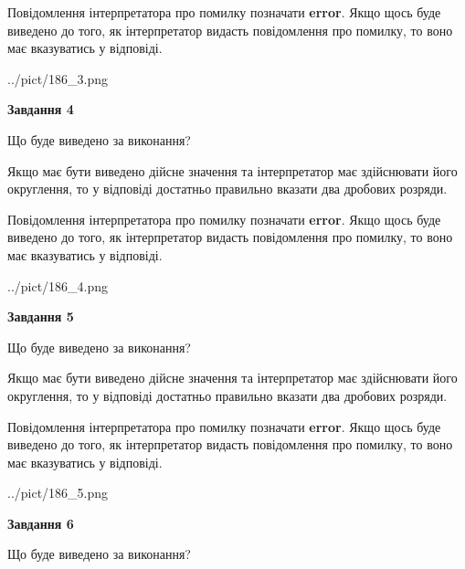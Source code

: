 \documentclass[12pt, ukrainian]{article}
\begin{document}
{\begin {Large}
Повідомлення інтерпретатора про помилку позначати \textbf{error}.
Якщо щось буде виведено до того, як інтерпретатор видасть повідомлення про помилку, 
то воно має вказуватись у відповіді. \par

\begin{center}
	{../pict/186_3.png}
\end{center}
\newpage

{\begin {center}\textbf{Завдання 4}\end {center}}\par
Що буде виведено за виконання? \par

Якщо має бути виведено дійсне значення та інтерпретатор має здійснювати його округлення, 
то у відповіді достатньо правильно вказати два дробових розряди.

Повідомлення інтерпретатора про помилку позначати \textbf{error}.
Якщо щось буде виведено до того, як інтерпретатор видасть повідомлення про помилку, 
то воно має вказуватись у відповіді. \par

\begin{center}
	{../pict/186_4.png}
\end{center}
\newpage

{\begin {center}\textbf{Завдання 5}\end {center}}\par
Що буде виведено за виконання? \par

Якщо має бути виведено дійсне значення та інтерпретатор має здійснювати його округлення, 
то у відповіді достатньо правильно вказати два дробових розряди.

Повідомлення інтерпретатора про помилку позначати \textbf{error}.
Якщо щось буде виведено до того, як інтерпретатор видасть повідомлення про помилку, 
то воно має вказуватись у відповіді. \par

\begin{center}
	{../pict/186_5.png}
\end{center}
\newpage

{\begin {center}\textbf{Завдання 6}\end {center}}\par
Що буде виведено за виконання? \par


\end{Large}}
\end{document}
